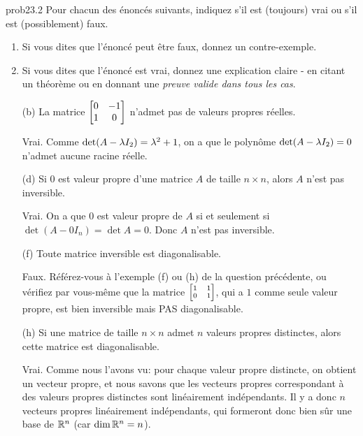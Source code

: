 \begin{sol}{prob23.2}   Pour chacun des énoncés suivants, indiquez s'il est (toujours) vrai ou s'il est (possiblement) faux.    
\begin{enumerate}[$\bullet$]
\item Si vous dites que l'\'enonc\'e peut être faux, donnez un contre-exemple.   
\item Si vous dites que l'\'enonc\'e est vrai, donnez une explication claire - en citant un théorème ou en donnant une {\it preuve valide dans tous les cas}. 
\end{enumerate}

\begin{enumerate}[]

\medskip
\item[(b)] La matrice $\bmatrix 0&-1\\1&0\endbmatrix$ n'admet pas de valeurs propres r\'eelles.

\soln Vrai. Comme $\det(A-\lambda I_2) =\lambda^2 +1$, on a que le polynôme $\det(A-\lambda I_2)=0$ n'admet aucune racine r\'eelle. 
\medskip
 


\item[(d)] Si $0$ est valeur propre d'une matrice $A$ de taille $n \times n$, alors $A$ n'est pas inversible.

\soln Vrai. On a que $0$ est valeur propre de $A$ si et seulement si $\det(A-0I_n)=\det A=0$. Donc $A$ n'est pas
inversible.
\medskip
 
 
\item[(f)] Toute matrice inversible est diagonalisable.

\soln Faux. R\'ef\'erez-vous à l'exemple (f) ou (h) de la question précédente, ou vérifiez par vous-même que la matrice $\scriptsize\bmatrix 1&1\\ 0&1\endbmatrix$, qui a $1$ comme seule valeur propre, est bien inversible mais PAS diagonalisable.
\medskip
 
\item[(h)] Si une matrice de taille $n \times n$ admet $n$ valeurs propres distinctes, alors cette matrice est diagonalisable. 

\soln Vrai. Comme nous l'avons vu: pour chaque valeur propre distincte, on obtient un vecteur propre, et nous savons que les vecteurs propres correspondant à des valeurs propres distinctes sont linéairement indépendants. Il y a donc $n$ vecteurs propres linéairement indépendants, qui formeront donc bien sûr une base de $\mathbb{R}^n$ (car $\dim \mathbb{R}^n=n$).
\medskip
 



\end{enumerate}
\end{sol}
